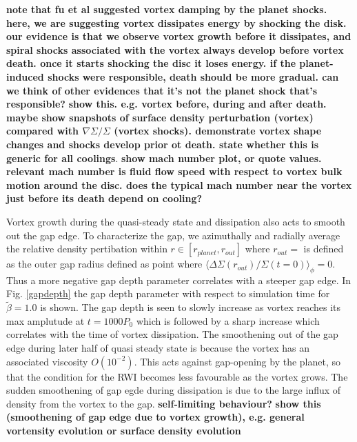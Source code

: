 {\bf note that fu et al suggested vortex damping by the planet
  shocks. here, we are suggesting vortex dissipates energy by shocking
  the disk. our evidence is that we observe vortex growth before it
  dissipates, and spiral shocks associated with the vortex always
  develop before vortex death. once it starts shocking the disc it
  loses energy. if the planet-induced shocks were responsible, death
  should be more gradual. can we think of other evidences that it's
  not the planet shock that's responsible?}
{\bf show
  this. e.g. vortex before, during and after death. maybe show
  snapshots of surface density perturbation (vortex) compared with
  $\nabla\Sigma/\Sigma$ (vortex shocks). demonstrate vortex shape
  changes and shocks develop prior ot death. state whether this is
  generic for all coolings}. 
{\bf show mach number plot, or quote values. relevant mach
  number is fluid flow speed with respect to 
  vortex bulk motion around the disc. does the typical mach number
  near the vortex just before its death depend on cooling?} 

Vortex growth during the quasi-steady state and dissipation also acts to smooth
out the gap edge. To characterize the gap, we azimuthally and radially average
the relative density pertibation within $r\in[r_{planet},r_{out}]$ where
 $r_{out}=$ is defined as the outer gap radius defined as point where
$\langle\Delta \Sigma(r_{out})/\Sigma(t=0)\rangle_{\phi}=0$. Thus a more 
negative gap depth parameter correlates with a steeper gap edge. In
 Fig. \ref{gapdepth} the gap depth parameter with respect to simulation time
for $\tilde\beta=1.0$ is shown. The gap depth is seen to slowly increase as
vortex reaches its max amplutude at $t=1000P_0$ which is followed by a sharp
increase which correlates with the time of vortex dissipation.
The smoothening out of the gap edge during later half of quasi steady state
 is because the vortex has an associated viscosity $O(10^{-2})$.
 This acts
against gap-opening by the planet, so that the condition for the RWI
becomes less favourable as the vortex grows.
The sudden smoothening of gap egde during dissipation is due to the large
influx of density from the vortex to the gap.
{\bf self-limiting
  behaviour?} 
{\bf show this (smoothening of gap edge due to vortex growth),
  e.g. general vortensity evolution or surface density 
  evolution}

